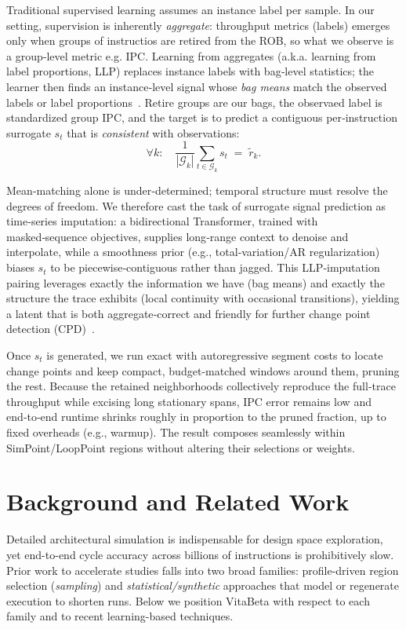 Traditional supervised learning assumes an instance label per sample. In our setting, supervision is inherently \emph{aggregate}:  throughput metrics (labels) emerges only when groups of instructios are retired from the ROB, so what we observe is a group‑level metric e.g. IPC. Learning from aggregates (a.k.a. learning from label proportions, LLP) replaces instance labels with bag‑level statistics; the learner then finds an instance‑level signal whose \emph{bag means} match the observed labels or label proportions~\cite{yu2014-llp,scott2020-llp,law2018-agg,zhang2020-agg}. Retire groups are our bags, the observaed label is standardized group IPC, and the target is to predict a contiguous per‑instruction surrogate \(s_t\) that is \emph{consistent} with observations:
$$
\forall k:\quad \frac{1}{|\mathcal{G}_k|}\sum_{t\in \mathcal{G}_k} s_t \;=\; \tilde{r}_k.
$$

Mean‑matching alone is under‑determined; temporal structure must resolve the degrees of freedom. We therefore cast the task of surrogate signal prediction as time‑series imputation: a bidirectional Transformer, trained with masked‑sequence objectives, supplies long‑range context to denoise and interpolate, while a smoothness prior (e.g., total‑variation/AR regularization) biases \(s_t\) to be piecewise‑contiguous rather than jagged. This LLP‑imputation pairing leverages exactly the information we have (bag means) and exactly the structure the trace exhibits (local continuity with occasional transitions), yielding a latent that is both aggregate‑correct and friendly for further change point detection (CPD)~\cite{yu2014-llp,scott2020-llp,law2018-agg,zhang2020-agg}.

Once \(s_t\) is generated, we run exact \pelt with autoregressive segment costs to locate change points and keep compact, budget‑matched windows around them, pruning the rest. Because the retained neighborhoods collectively reproduce the full‑trace throughput while excising long stationary spans, IPC error remains low and end‑to‑end runtime shrinks roughly in proportion to the pruned fraction, up to fixed overheads (e.g., warmup). The result composes seamlessly within SimPoint/LoopPoint regions without altering their selections or weights.
 

\section{Background and Related Work}\label{background}

Detailed architectural simulation is indispensable for design space exploration, yet end-to-end cycle accuracy across billions of instructions is prohibitively slow. Prior work to accelerate studies falls into two broad families: profile-driven region selection (\emph{sampling}) and \emph{statistical/synthetic} approaches that model or regenerate execution to shorten runs.  Below we position VitaBeta with respect to each family and to recent learning-based techniques. 

